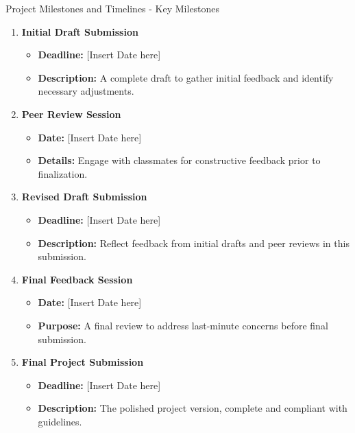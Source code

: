 \documentclass[aspectratio=169]{beamer}
\begin{document}
\begin{frame}[fragile]{Project Milestones and Timelines - Key Milestones}
    \begin{enumerate}
        \item \textbf{Initial Draft Submission}
            \begin{itemize}
                \item \textbf{Deadline:} [Insert Date here]
                \item \textbf{Description:} A complete draft to gather initial feedback and identify necessary adjustments.
            \end{itemize}
        
        \item \textbf{Peer Review Session}
            \begin{itemize}
                \item \textbf{Date:} [Insert Date here]
                \item \textbf{Details:} Engage with classmates for constructive feedback prior to finalization.
            \end{itemize}
        
        \item \textbf{Revised Draft Submission}
            \begin{itemize}
                \item \textbf{Deadline:} [Insert Date here]
                \item \textbf{Description:} Reflect feedback from initial drafts and peer reviews in this submission.
            \end{itemize}
        
        \item \textbf{Final Feedback Session}
            \begin{itemize}
                \item \textbf{Date:} [Insert Date here]
                \item \textbf{Purpose:} A final review to address last-minute concerns before final submission.
            \end{itemize}
        
        \item \textbf{Final Project Submission}
            \begin{itemize}
                \item \textbf{Deadline:} [Insert Date here]
                \item \textbf{Description:} The polished project version, complete and compliant with guidelines.
            \end{itemize}
    \end{enumerate}
\end{frame}
\end{document}
